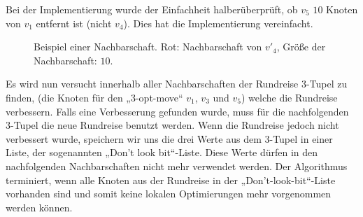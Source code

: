 \begin{bem}
  Bei der Implementierung wurde der Einfachheit halberüberprüft, 
  ob $v_5$ $10$ Knoten von $v_1$ entfernt ist (nicht $v_4$). Dies hat
  die Implementierung vereinfacht. 
\end{bem}
\begin{figure}[bh]
  \centering
  \caption[Beispiel einer Nachbarschaft $\mathcal{N}(v)$]{Beispiel
  einer Nachbarschaft. Rot: Nachbarschaft von $v'_4$, Größe der
  Nachbarschaft: $10$.}
\end{figure}
\noindent
Es wird nun versucht innerhalb aller Nachbarschaften der Rundreise 3-Tupel zu finden, (die
Knoten für den „3-opt-move“ $v_1$, $v_3$ und $v_5$) welche die Rundreise
verbessern.
\noindent
Falls eine Verbesserung gefunden wurde, muss für die nachfolgenden
3-Tupel die neue Rundreise benutzt werden. Wenn die Rundreise jedoch
nicht verbessert wurde, speichern wir uns die drei Werte aus dem 3-Tupel
in einer Liste, der sogenannten „Don't look bit“-Liste. Diese Werte dürfen in den
nachfolgenden Nachbarschaften nicht mehr verwendet werden. Der
Algorithmus terminiert, wenn alle Knoten aus der Rundreise in der
„Don't-look-bit“-Liste vorhanden sind und somit keine lokalen
Optimierungen mehr vorgenommen werden können.
\newpage


